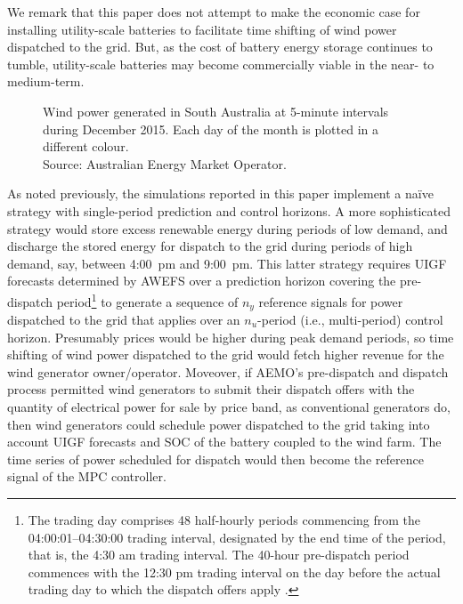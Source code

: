 We remark that this paper does not attempt to make the economic case for installing utility-scale batteries to facilitate time shifting of wind power dispatched to the grid.  But, as the cost of battery energy storage continues to tumble, utility-scale batteries may become commercially viable in the near- to medium-term.

\begin{figure}[!t]
	\centering
	\caption[Wind power generated in SA during December 2015]{Wind power generated in South Australia at 5-minute intervals during December 2015.  Each day of the month is plotted in a different colour.	\protect\\
		{\footnotesize Source: Australian Energy Market Operator.}} 
	\label{fig:wind_gen_1512}
	\scalebox{0.90}{
		
	}
\end{figure}

As noted previously, the simulations reported in this paper implement a na\"ive strategy with single-period prediction and control horizons.  A more sophisticated strategy would store excess renewable energy during periods of low demand, and discharge the stored energy for dispatch to the grid during periods of high demand, say, between 4:00~pm and 9:00~pm.  This latter strategy requires UIGF forecasts determined by AWEFS over a prediction horizon covering the pre-dispatch period\footnote{
The trading day comprises 48 half-hourly periods commencing from the 04:00:01--04:30:00 trading interval, designated by the end time of the period, that is, the 4:30 am trading interval.  The 40-hour pre-dispatch period commences with the 12:30 pm trading interval on the day before the actual trading day to which the dispatch offers apply \citeyearpar[AEMO,][]{AEMO10}.
} to generate a sequence of $n_{y}$ reference signals for power dispatched to the grid that applies over an $n_{u}$-period (i.e., multi-period) control horizon.  Presumably prices would be higher during peak demand periods, so time shifting of wind power dispatched to the grid would fetch higher revenue for the wind generator owner/operator.  Moveover, if AEMO's pre-dispatch and dispatch process \citeyearpar[AEMO,][]{AEMO10} permitted wind generators to submit their dispatch offers with the quantity of electrical power for sale by price band, as conventional generators do, then wind generators could schedule power dispatched to the grid taking into account UIGF forecasts and SOC of the battery coupled to the wind farm.  The time series of power scheduled for dispatch would then become the reference signal of the MPC controller.

